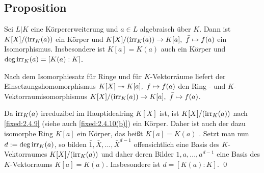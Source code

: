 \subsection{Proposition} Sei $L|K$ eine Körpererweiterung und $a \in L$ algebraisch über $K$. Dann ist $K[X]/(\operatorname{irr}_K(a))$ ein Körper und $K[X]/(\operatorname{irr}_K(a)) \to K[a],~\bar f \mapsto f(a)$ ein Isomorphismus. Insbesondere ist $K[a] = K(a)$ auch ein Körper und $\deg \operatorname{irr}_K(a) = [K(a):K]$.

\proof Nach dem Isomorphiesatz für Ringe und für $K$-Vektorräume liefert der Einsetzungshomomorphismus $K[X] \twoheadrightarrow K[a],~f \mapsto f(a)$ den Ring - und $K$-Vektorraumisomorphismus $K[X]/(\operatorname{irr}_K(a)) \to K[a],~\bar f \mapsto f(a)$.

Da $\operatorname{irr}_K(a)$ irreduzibel im Hauptidealring $K[X]$ ist, ist $K[X]/(\operatorname{irr}_K(a))$ nach \ref{fixed:2.4.9} (siehe auch \ref{fixed:2.4.10(b)}) ein Körper. Daher ist auch der dazu isomorphe Ring $K[a]$ ein Körper, das heißt $K[a] = K(a)$ \ALref{\ref{fixed:2.3.11(b)}}. Setzt man nun $d := \deg \operatorname{irr}_K(a)$, so bilden $\bar 1, \bar X, ..., \bar X^{d-1}$ offensichtlich eine Basis des $K$-Vektorraumes $K[X]/(\operatorname{irr}_K(a))$ und daher deren Bilder $1, a, ..., a^{d-1}$ eine Basis des $K$-Vektorraums $K[a] = K(a)$. Insbesondere ist $d = [K(a):K]$. \qed
